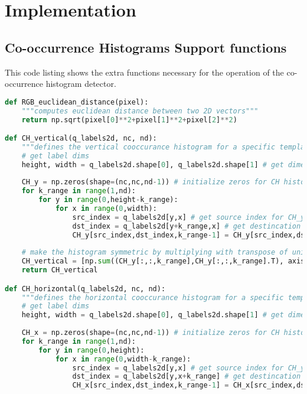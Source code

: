 \appendix

\chapter{Implementation}\label{appendix_implementation}

\section{Co-occurrence Histograms Support functions}\label{supportCH}
This code listing shows the extra functions necessary for the operation of the
co-occurrence histogram detector.
\begin{lstlisting}[language=Python, caption={Additional functions for Co-occurrence Histogram Detection}, captionpos=b, label={lst:supportCH}]
def RGB_euclidean_distance(pixel):
    """computes euclidean distance between two 2D vectors"""
    return np.sqrt(pixel[0]**2+pixel[1]**2+pixel[2]**2)

def CH_vertical(q_labels2d, nc, nd):
    """defines the vertical cooccurance histogram for a specific template according to quantized colourspace labels matrix and distances"""
    # get label dims
    height, width = q_labels2d.shape[0], q_labels2d.shape[1] # get dimensions
    
    CH_y = np.zeros(shape=(nc,nc,nd-1)) # initialize zeros for CH histogram according to quantizations size
    for k_range in range(1,nd):
        for y in range(0,height-k_range):
            for x in range(0,width):
                src_index = q_labels2d[y,x] # get source index for CH_y at (y,x)
                dst_index = q_labels2d[y+k_range,x] # get destincation index for CH_y at (y+k,x)
                CH_y[src_index,dst_index,k_range-1] = CH_y[src_index,dst_index,k_range-1] + 1 # update histogram count in bin (src_index,dst_index)
                
    # make the histogram symmetric by multiplying with transpose of unidirectional cooccurance histogram
    CH_vertical = [np.sum((CH_y[:,:,k_range],CH_y[:,:,k_range].T), axis=0) for k_range in range(0,nd-1)]
    return CH_vertical

def CH_horizontal(q_labels2d, nc, nd):
    """defines the horizontal cooccurance histogram for a specific template according to quantized colourspace labels matrix and distances"""
    # get label dims
    height, width = q_labels2d.shape[0], q_labels2d.shape[1] # get dimensions
    
    CH_x = np.zeros(shape=(nc,nc,nd-1)) # initialize zeros for CH histogram according to quantizations size
    for k_range in range(1,nd):
        for y in range(0,height):
            for x in range(0,width-k_range):
                src_index = q_labels2d[y,x] # get source index for CH_y at (y,x)
                dst_index = q_labels2d[y,x+k_range] # get destincation index for CH_y at (y+k,x)
                CH_x[src_index,dst_index,k_range-1] = CH_x[src_index,dst_index,k_range-1] + 1 # update histogram count in bin (src_index,dst_index)
    

\end{lstlisting}
